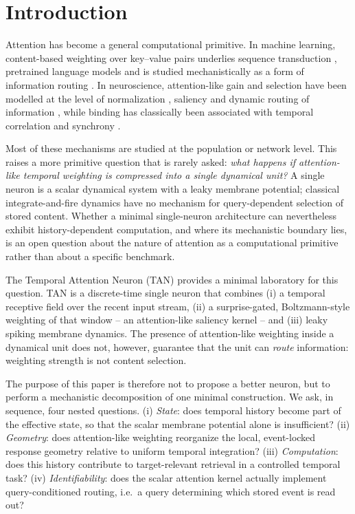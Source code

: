 \section{Introduction}\label{sec:intro}

Attention has become a general computational primitive.  In machine
learning, content-based weighting over key--value pairs underlies
sequence transduction \citep{vaswani2017,bahdanau2015,luong2015},
pretrained language models \citep{devlin2019,brown2020} and is studied
mechanistically as a form of information routing
\citep{elhage2021,olsson2022}.  In neuroscience, attention-like gain and
selection have been modelled at the level of normalization
\citep{reynolds2009}, saliency \citep{koch1985,itti1998} and dynamic
routing of information \citep{olshausen1993}, while binding has classically
been associated with temporal correlation and synchrony
\citep{von_der_malsburg1995,von_der_malsburg1986,singer1995,treisman1980}.

Most of these mechanisms are studied at the population or network level.
This raises a more primitive question that is rarely asked: \emph{what
happens if attention-like temporal weighting is compressed into a single
dynamical unit?}  A single neuron is a scalar dynamical system with a
leaky membrane potential; classical integrate-and-fire dynamics
\citep{lapicque1907,abbott1999,hodgkin1952,burkitt2006,gerstner2014} have
no mechanism for query-dependent selection of stored content.  Whether a
minimal single-neuron architecture can nevertheless exhibit
history-dependent computation, and where its mechanistic boundary lies,
is an open question about the nature of attention as a computational
primitive rather than about a specific benchmark.

The Temporal Attention Neuron (TAN) provides a minimal laboratory for
this question.  TAN is a discrete-time single neuron that combines (i) a
temporal receptive field over the recent input stream, (ii) a
surprise-gated, Boltzmann-style weighting of that window -- an
attention-like saliency kernel -- and (iii) leaky spiking membrane
dynamics.  The presence of attention-like weighting inside a dynamical
unit does not, however, guarantee that the unit can \emph{route}
information: weighting strength is not content selection.

The purpose of this paper is therefore not to propose a better neuron,
but to perform a mechanistic decomposition of one minimal construction.
We ask, in sequence, four nested questions.  (i) \emph{State}: does
temporal history become part of the effective state, so that the scalar
membrane potential alone is insufficient?  (ii) \emph{Geometry}: does
attention-like weighting reorganize the local, event-locked response
geometry relative to uniform temporal integration?  (iii)
\emph{Computation}: does this history contribute to target-relevant
retrieval in a controlled temporal task?  (iv) \emph{Identifiability}:
does the scalar attention kernel actually implement query-conditioned
routing, i.e.\ a query determining which stored event is read out?

